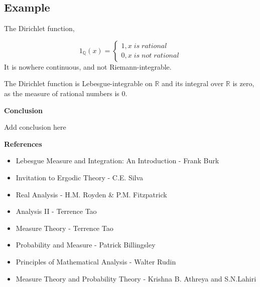 \documentclass{article}
\begin{document}
\subsection{Example}
The Dirichlet function,

\[ 1_{\mathbb{Q}}(x)=\begin{cases} 
    1 , x \;is\; rational \\
    0 , x \;is\; not\; rational
   \end{cases}
\]
 It is nowhere continuous, and not Riemann-integrable.\medskip
 
 The Dirichlet function is Lebesgue-integrable on $\mathbb{R}$ and its integral over $\mathbb{R}$ is zero, as the measure of rational numbers is 0.



\newpage
\begin{center}
    {\Large\bfseries\noindent Conclusion}
\end{center}
	Add conclusion here
\newpage
\begin{center}
    {\Large\bfseries\noindent References}
\end{center}
\begin{itemize}
    \item Lebesgue Measure and Integration: An Introduction - Frank Burk
    \item Invitation to Ergodic Theory - C.E. Silva
    \item Real Analysis - H.M. Royden \& P.M. Fitzpatrick
    \item Analysis II - Terrence Tao
    \item Measure Theory - Terrence Tao
    \item Probability and Measure - Patrick Billingsley
    \item Principles of Mathematical Analysis - Walter Rudin
    \item Measure Theory and Probability Theory - Krishna B. Athreya and S.N.Lahiri
    
\end{itemize}
\end{document}
